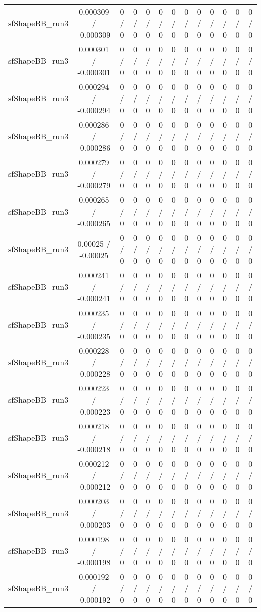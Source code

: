 \documentclass[10pt]{article}
\begin{document}
\begin{table}[htbp]
\begin{center}
\begin{tabular}{|c|c|c|c|c|c|c|c|c|c|c|c|c|}
  sfShapeBB_run3 & 0.000309 / -0.000309 & 0 / 0 & 0 / 0 & 0 / 0 & 0 / 0 & 0 / 0 & 0 / 0 & 0 / 0 & 0 / 0 & 0 / 0 & 0 / 0 & 0 / 0 \\ 
  sfShapeBB_run3 & 0.000301 / -0.000301 & 0 / 0 & 0 / 0 & 0 / 0 & 0 / 0 & 0 / 0 & 0 / 0 & 0 / 0 & 0 / 0 & 0 / 0 & 0 / 0 & 0 / 0 \\ 
  sfShapeBB_run3 & 0.000294 / -0.000294 & 0 / 0 & 0 / 0 & 0 / 0 & 0 / 0 & 0 / 0 & 0 / 0 & 0 / 0 & 0 / 0 & 0 / 0 & 0 / 0 & 0 / 0 \\ 
  sfShapeBB_run3 & 0.000286 / -0.000286 & 0 / 0 & 0 / 0 & 0 / 0 & 0 / 0 & 0 / 0 & 0 / 0 & 0 / 0 & 0 / 0 & 0 / 0 & 0 / 0 & 0 / 0 \\ 
  sfShapeBB_run3 & 0.000279 / -0.000279 & 0 / 0 & 0 / 0 & 0 / 0 & 0 / 0 & 0 / 0 & 0 / 0 & 0 / 0 & 0 / 0 & 0 / 0 & 0 / 0 & 0 / 0 \\ 
  sfShapeBB_run3 & 0.000265 / -0.000265 & 0 / 0 & 0 / 0 & 0 / 0 & 0 / 0 & 0 / 0 & 0 / 0 & 0 / 0 & 0 / 0 & 0 / 0 & 0 / 0 & 0 / 0 \\ 
  sfShapeBB_run3 & 0.00025 / -0.00025 & 0 / 0 & 0 / 0 & 0 / 0 & 0 / 0 & 0 / 0 & 0 / 0 & 0 / 0 & 0 / 0 & 0 / 0 & 0 / 0 & 0 / 0 \\ 
  sfShapeBB_run3 & 0.000241 / -0.000241 & 0 / 0 & 0 / 0 & 0 / 0 & 0 / 0 & 0 / 0 & 0 / 0 & 0 / 0 & 0 / 0 & 0 / 0 & 0 / 0 & 0 / 0 \\ 
  sfShapeBB_run3 & 0.000235 / -0.000235 & 0 / 0 & 0 / 0 & 0 / 0 & 0 / 0 & 0 / 0 & 0 / 0 & 0 / 0 & 0 / 0 & 0 / 0 & 0 / 0 & 0 / 0 \\ 
  sfShapeBB_run3 & 0.000228 / -0.000228 & 0 / 0 & 0 / 0 & 0 / 0 & 0 / 0 & 0 / 0 & 0 / 0 & 0 / 0 & 0 / 0 & 0 / 0 & 0 / 0 & 0 / 0 \\ 
  sfShapeBB_run3 & 0.000223 / -0.000223 & 0 / 0 & 0 / 0 & 0 / 0 & 0 / 0 & 0 / 0 & 0 / 0 & 0 / 0 & 0 / 0 & 0 / 0 & 0 / 0 & 0 / 0 \\ 
  sfShapeBB_run3 & 0.000218 / -0.000218 & 0 / 0 & 0 / 0 & 0 / 0 & 0 / 0 & 0 / 0 & 0 / 0 & 0 / 0 & 0 / 0 & 0 / 0 & 0 / 0 & 0 / 0 \\ 
  sfShapeBB_run3 & 0.000212 / -0.000212 & 0 / 0 & 0 / 0 & 0 / 0 & 0 / 0 & 0 / 0 & 0 / 0 & 0 / 0 & 0 / 0 & 0 / 0 & 0 / 0 & 0 / 0 \\ 
  sfShapeBB_run3 & 0.000203 / -0.000203 & 0 / 0 & 0 / 0 & 0 / 0 & 0 / 0 & 0 / 0 & 0 / 0 & 0 / 0 & 0 / 0 & 0 / 0 & 0 / 0 & 0 / 0 \\ 
  sfShapeBB_run3 & 0.000198 / -0.000198 & 0 / 0 & 0 / 0 & 0 / 0 & 0 / 0 & 0 / 0 & 0 / 0 & 0 / 0 & 0 / 0 & 0 / 0 & 0 / 0 & 0 / 0 \\ 
  sfShapeBB_run3 & 0.000192 / -0.000192 & 0 / 0 & 0 / 0 & 0 / 0 & 0 / 0 & 0 / 0 & 0 / 0 & 0 / 0 & 0 / 0 & 0 / 0 & 0 / 0 & 0 / 0 \\ 

\end{tabular}
\end{center}
\end{table}
\end{document}
